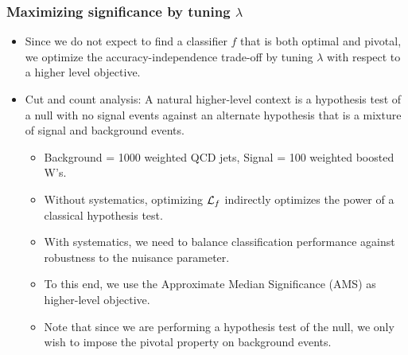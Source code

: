 \documentclass{beamer}
\begin{document}
\begin{frame}
    \frametitle{Maximizing significance by tuning $\lambda$}

    \begin{itemize}
        \item Since we do not expect to find a classifier $f$ that is both optimal and pivotal,
              we optimize the accuracy-independence trade-off by {\color{blue} tuning $\lambda$ with respect
        to a higher level objective}.

        \item Cut and count analysis: A natural higher-level context is a hypothesis test of
        a null with no signal events against an alternate hypothesis that is a mixture
        of signal and background events.
        \begin{itemize}
            \item Background = 1000 weighted QCD jets, Signal = 100 weighted boosted W's.
            \item Without systematics, optimizing ${\cal L}_f$
            indirectly optimizes the power of a classical hypothesis test.
            \item With systematics, we need to balance classification performance
            against robustness to the nuisance parameter.
            \item To this end, we use the {\color{red}Approximate Median Significance (AMS)} as higher-level objective.
            \item Note that since we are performing a hypothesis test of
            the null, we only wish to impose the pivotal property on background events.
        \end{itemize}

    \end{itemize}
\end{frame}
\end{document}
